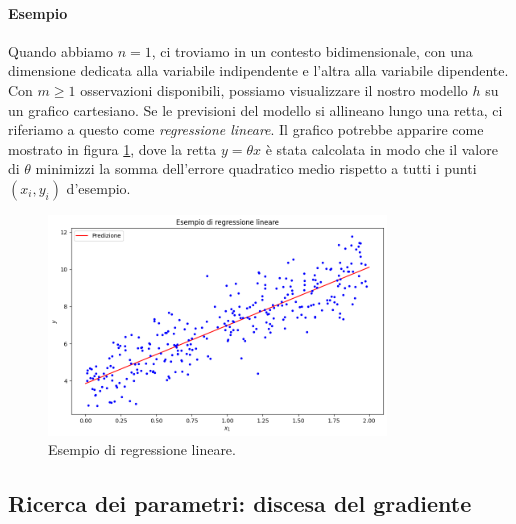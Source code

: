 \documentclass[12pt,a4paper,twoside,openright]{book}
\begin{document}
\paragraph{Esempio}
Quando abbiamo $n=1$, ci troviamo in un contesto bidimensionale, con una dimensione dedicata alla variabile indipendente e l'altra alla variabile dipendente. Con $m \geq 1$ osservazioni disponibili, possiamo visualizzare il nostro modello $h$ su un grafico cartesiano. Se le previsioni del modello si allineano lungo una retta, ci riferiamo a questo come \emph{regressione lineare}. Il grafico potrebbe apparire come mostrato in figura \ref{fig:lin-reg}, dove la retta $y = \theta x$ è stata calcolata in modo che il valore di $\theta$ minimizzi la somma dell'errore quadratico medio rispetto a tutti i punti $(x_i, y_i)$ d'esempio. 



\begin{figure}
    \centering
    \includegraphics[width=0.8\textwidth]{images/regr_lin.png}
    \caption{Esempio di regressione lineare.}
    \label{fig:lin-reg}
\end{figure}



\subsection{Ricerca dei parametri: discesa del gradiente}
\label{gradiente}
\end{document}
